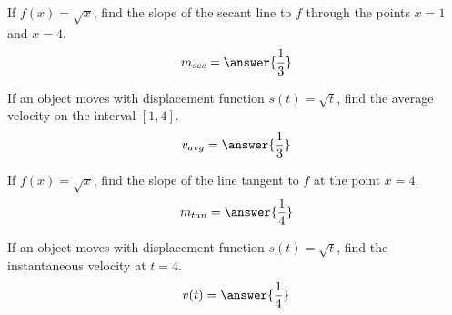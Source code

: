 \documentclass{ximera}
\author{Bobby Ramsey}
\begin{document}
\begin{exercise}
	
	If $f(x) = \sqrt{x}$,
	find the slope of the secant line to $f$ through the points $x=1$ and $x=4$.
	\[ m_{sec} = \answer{\frac{1}{3}} \]

	\begin{exercise}
		If an object moves with displacement function 
		$s(t) = \sqrt{t}$, find the average velocity on the interval $[1,4]$.
		\[ v_{avg} = \answer{\frac{1}{3}} \]
	\end{exercise}

\end{exercise}

\begin{exercise}
	If $f(x) = \sqrt{x}$, find the slope of the line tangent to $f$ at the point $x=4$.
	\[ m_{tan} = \answer{\frac{1}{4}} \]
	\begin{exercise}
		If an object moves with displacement function $s(t) = \sqrt{t}$,
		find the instantaneous velocity at $t=4$.
		\[ v(t) = \answer{\frac{1}{4}} \]
	\end{exercise} 

\end{exercise}
\end{document}
